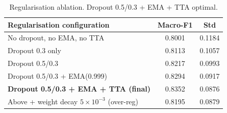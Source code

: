 \begin{table}[t]
\centering
\small
\caption{Regularisation ablation. Dropout 0.5/0.3 + EMA + TTA optimal.}
\label{tab:regularisation_ablation}
\begin{tabular}{lcc}
\toprule
\textbf{Regularisation configuration} & \textbf{Macro-F1} & \textbf{Std} \\
\midrule
No dropout, no EMA, no TTA & 0.8001 & 0.1184 \\
Dropout 0.3 only & 0.8113 & 0.1057 \\
Dropout 0.5/0.3 & 0.8217 & 0.0993 \\
Dropout 0.5/0.3 + EMA(0.999) & 0.8294 & 0.0917 \\
\textbf{Dropout 0.5/0.3 + EMA + TTA (final)} & 0.8352 & 0.0876 \\
Above + weight decay $5\times10^{-3}$ (over-reg) & 0.8195 & 0.0879 \\
\bottomrule
\end{tabular}
\end{table}
